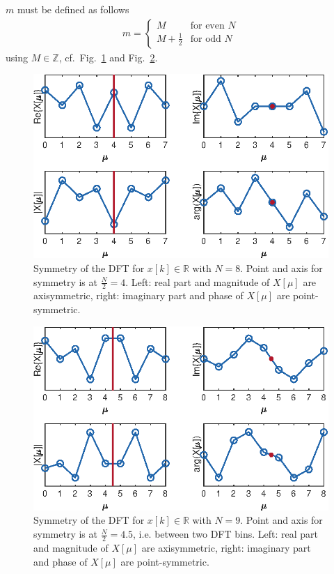 \documentclass[11pt,a4paper,DIV=12]{scrartcl}
\begin{document}
$m$ must be defined as follows
\begin{align}
m=\begin{cases}M&\text{for even }N\\
M+\frac{1}{2}&\text{for odd }N\end{cases}
\end{align}
%
using $M\in\mathbb{Z}$, cf.~Fig.~\ref{Symmetry_DFT_N8} and Fig.~\ref{Symmetry_DFT_N9}.
%
\begin{figure}
		\centering
		\includegraphics[]{graphics/Symmetry_DFT_N8}
		\caption{Symmetry of the DFT for $x[k]\in\mathbb{R}$ with $N=8$.
		Point and axis for symmetry is at $\frac{N}{2}=4$.
		Left: real part and magnitude of $X[\mu]$ are axisymmetric,
		right: imaginary part and phase of $X[\mu]$ are point-symmetric.}
		\label{Symmetry_DFT_N8}
\end{figure}
\begin{figure}
		\centering
		\includegraphics[]{graphics/Symmetry_DFT_N9}
		\caption{Symmetry of the DFT for $x[k]\in\mathbb{R}$ with $N=9$.
		Point and axis for symmetry is at $\frac{N}{2}=4.5$, i.e. between two DFT bins.
		Left: real part and magnitude of $X[\mu]$ are axisymmetric,
		right: imaginary part and phase of $X[\mu]$ are point-symmetric.}
		\label{Symmetry_DFT_N9}
\end{figure}
\end{document}
